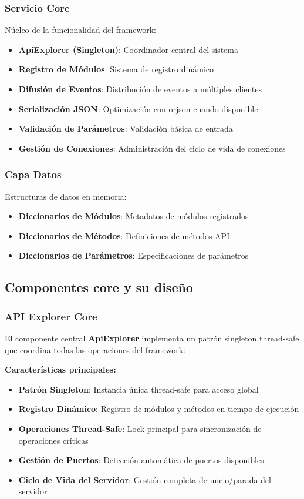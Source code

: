 \subsubsection{Servicio Core}
Núcleo de la funcionalidad del framework:
\begin{itemize}
    \item \textbf{ApiExplorer (Singleton)}: Coordinador central del sistema
    \item \textbf{Registro de Módulos}: Sistema de registro dinámico
    \item \textbf{Difusión de Eventos}: Distribución de eventos a múltiples clientes
    \item \textbf{Serialización JSON}: Optimización con orjson cuando disponible
    \item \textbf{Validación de Parámetros}: Validación básica de entrada
    \item \textbf{Gestión de Conexiones}: Administración del ciclo de vida de conexiones
\end{itemize}

\subsubsection{Capa Datos}
Estructuras de datos en memoria:
\begin{itemize}
    \item \textbf{Diccionarios de Módulos}: Metadatos de módulos registrados
    \item \textbf{Diccionarios de Métodos}: Definiciones de métodos API
    \item \textbf{Diccionarios de Parámetros}: Especificaciones de parámetros
\end{itemize}

\subsection{Componentes core y su diseño}
\label{subsec:componentes_core_api_explorer}

\subsubsection{API Explorer Core}

El componente central \textbf{ApiExplorer} implementa un patrón singleton thread-safe que coordina todas las operaciones del framework:

\textbf{Características principales:}
\begin{itemize}
    \item \textbf{Patrón Singleton}: Instancia única thread-safe para acceso global
    \item \textbf{Registro Dinámico}: Registro de módulos y métodos en tiempo de ejecución
    \item \textbf{Operaciones Thread-Safe}: Lock principal para sincronización de operaciones críticas
    \item \textbf{Gestión de Puertos}: Detección automática de puertos disponibles
    \item \textbf{Ciclo de Vida del Servidor}: Gestión completa de inicio/parada del servidor
\end{itemize}

